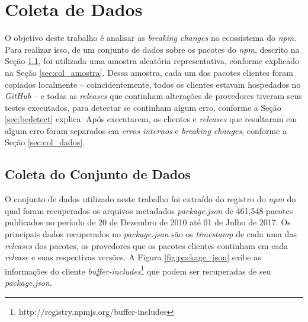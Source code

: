 \chapter{Coleta de Dados}
\label{cap:metodologia}

O objetivo deste trabalho é analisar as \textit{breaking changes} no ecossistema do \textit{npm}. Para realizar isso, de um conjunto de dados sobre os pacotes do \textit{npm}, descrito na Seção \ref{sec:col_base}, foi utilizada uma amostra aleatória representativa, conforme explicado na Seção \ref{sec:col_amostra}. Dessa amostra, cada um dos pacotes clientes foram copiados localmente -- coincidentemente, todos os clientes estavam hospedados no \textit{GitHub} -- e todas as \textit{releases} que continham alterações de provedores tiveram seus testes executados, para detectar se continham algum erro, conforme a Seção \ref{sec:bcdetect} explica. Após executarem, os clientes e \textit{releases} que resultaram em algum erro foram separados em \textit{erros internos} e \textit{breaking changes}, conforme a Seção \ref{sec:col_dados}.

\section{Coleta do Conjunto de Dados}
\label{sec:col_base}
O conjunto de dados utilizado neste trabalho foi extraído do registro do \textit{npm} do qual foram recuperados os arquivos metadados \textit{package.json} de 461,548 pacotes publicados no período de 20 de Dezembro de 2010 até 01 de Julho de 2017. Os principais dados recuperados no \textit{package.json} são os \textit{timestamp} de cada uma das \textit{releases} dos pacotes, os provedores que os pacotes clientes continham em cada \textit{release} e suas respectivas versões. A Figura \ref{fig:package_json} exibe as informações do cliente \textit{buffer-includes}\footnote{http://registry.npmjs.org/buffer-includes} que podem ser recuperadas de seu \textit{package.json}.

